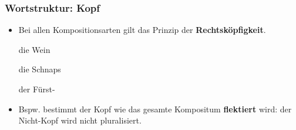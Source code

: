 \begin{frame}
\frametitle{Wortstruktur: Kopf}

\begin{itemize}
	\item Bei allen Kompositionsarten gilt das Prinzip der \textbf{Rechtsköpfigkeit}.
	
	\settowidth{} 
	\ea 
		\ea die Wein \jambox{[Determinativkompositum]} 
		
			\z 		
		
		\ex die Schnaps 	\jambox{\hfill [Possessivkompositum]} 
			\z 
	
		
		\ex der Fürst- \jambox{[Kopulativkompositum]} 
			\z 		
		\z 
	\z 

	\item Bspw. bestimmt der Kopf wie das gesamte Kompositum \textbf{flektiert} wird: der Nicht-Kopf wird nicht pluralisiert.

\end{itemize}

\end{frame}


